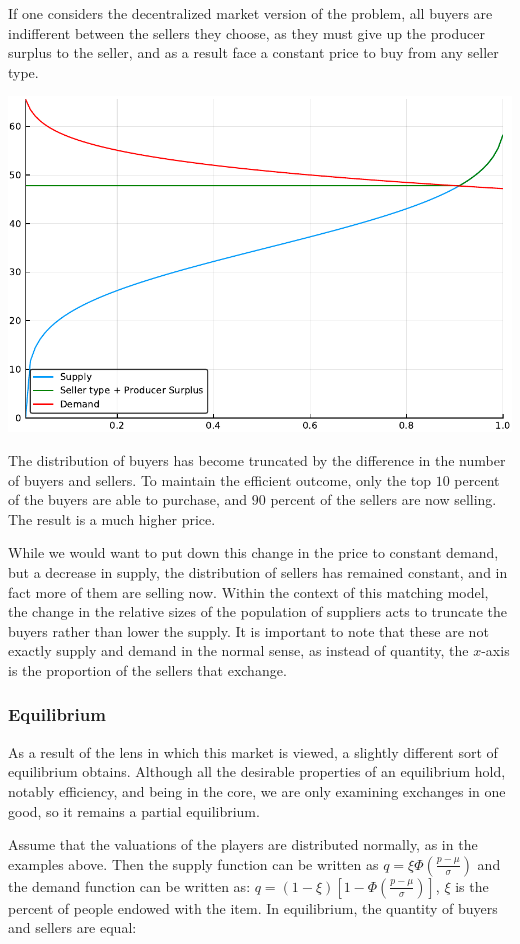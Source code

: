 \documentclass[12pt, letterpaper]{paper}
\begin{document}
If one considers the decentralized market version of the problem, all
buyers are indifferent between the sellers they choose, as they must
give up the producer surplus to the seller, and as a result face a
constant price to buy from any seller type. 

\includegraphics[width=.9\linewidth]{../Scripts/oneTenth.pdf}

The distribution of buyers has become truncated by the difference in
the number of buyers and sellers. To maintain the efficient outcome,
only the top $10$ percent of the buyers are able to purchase, and $90$
percent of the sellers are now selling. The result is a much higher
price.

While we would want to put down this change in the price to constant
demand, but a decrease in supply, the distribution of sellers has
remained constant, and in fact more of them are selling now. Within
the context of this matching model, the change in the relative sizes
of the population of suppliers acts to truncate the buyers rather than
lower the supply. It is important to note that these are not exactly
supply and demand in the normal sense, as instead of quantity, the
$x$-axis is the proportion of the sellers that exchange.

\subsubsection{Equilibrium}
\label{sec-2-1-2}
As a result of the lens in which this market is viewed, a slightly
different sort of equilibrium obtains. Although all the desirable
properties of an equilibrium hold, notably efficiency, and being in
the core, we are only examining exchanges in one good, so it remains a
partial equilibrium.

Assume that the valuations of the players are distributed
normally, as in the examples above. Then the supply function can be
written as $q = \xi \Phi \left ( \frac{ p - \mu }{\sigma} \right )$ and the demand
function can be written as: $q  = \left ( 1 - \xi \right ) \left [ 1 - \Phi \left ( \frac{
p - \mu }{ \sigma } \right ) \right ]$, $\xi$ is the percent of people endowed with
the item. In equilibrium, the quantity of buyers and sellers are
equal:
\end{document}

